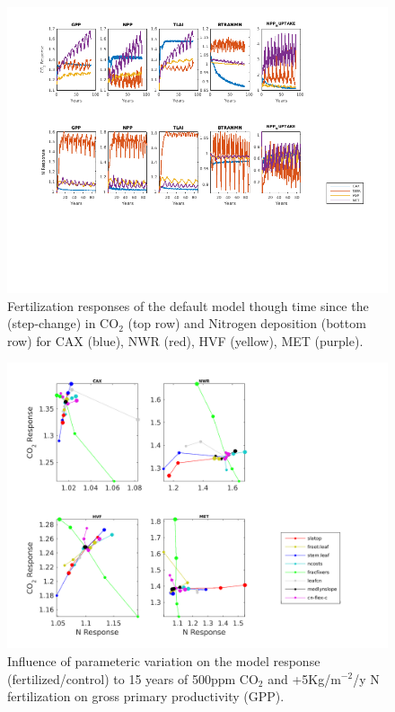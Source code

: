 \documentclass[draft,linenumbers]{agujournal}
\begin{document}
  \begin{figure}[h]
     \includegraphics[width=1.2\textwidth]{matlab/figures/MAY19jp_CNtime_defpft.png}
     \caption{Fertilization responses of the default model though time since the (step-change) in CO$_{2}$ (top row) and Nitrogen deposition (bottom row) for CAX (blue), NWR (red), HVF (yellow), MET (purple).}
     \label{timescales}
 \end{figure}
     
 \begin{figure}[h]
     \includegraphics[width=1.35\textwidth]{matlab/figures/MAY19jp_at_relCNdep_defpft_GPP_y2013.png}
     \caption{Influence of parameteric variation on the model response (fertilized/control) to 15 years of 500ppm CO$_{2}$ and +5Kg/m$^{-2}$/y N fertilization on gross primary productivity (GPP). }
     \label{GPP_CN}
  \end{figure}
\end{document}
